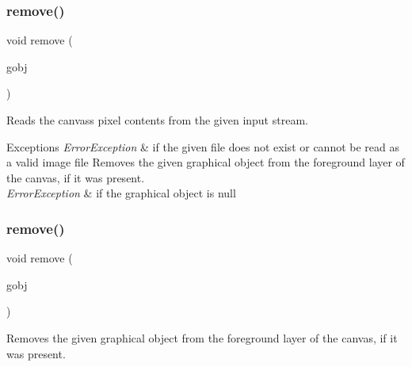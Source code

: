 \subsubsection{\texorpdfstring{remove()}{remove()}\hspace{0.1cm}{\footnotesize\ttfamily [1/2]}}
{\footnotesize\ttfamily void remove (\begin{DoxyParamCaption}\item[{\mbox{\hyperlink{classGObject}{G\+Object}} $\ast$}]{gobj }\end{DoxyParamCaption})\hspace{0.3cm}{\ttfamily [virtual]}}



Reads the canvas\textquotesingle{}s pixel contents from the given input stream. 


\begin{DoxyExceptions}{Exceptions}
{\em Error\+Exception} & if the given file does not exist or cannot be read as a valid image file Removes the given graphical object from the foreground layer of the canvas, if it was present. \\
\hline
{\em Error\+Exception} & if the graphical object is null \\
\hline
\end{DoxyExceptions}
\mbox{\label{classGCanvas_a0c0ae4d69b584602ff3cba0d9cf330a4}} 
\subsubsection{\texorpdfstring{remove()}{remove()}\hspace{0.1cm}{\footnotesize\ttfamily [2/2]}}
{\footnotesize\ttfamily void remove (\begin{DoxyParamCaption}\item[{\mbox{\hyperlink{classGObject}{G\+Object}} \&}]{gobj }\end{DoxyParamCaption})\hspace{0.3cm}{\ttfamily [virtual]}}



Removes the given graphical object from the foreground layer of the canvas, if it was present. 

\mbox{\label{classGInteractor_ab7fe7a876367b87cf7202f947f1d05e4}} 

